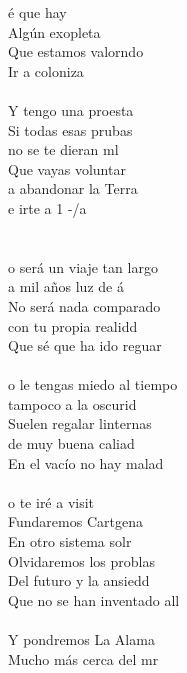 \begin{cancion}%
	é que hay\\
	Algún exopleta\\
	Que estamos valorndo\\
	Ir a coloniza\\
\jump\\
	Y tengo una proesta\\
	Si todas esas prubas \\
	no se te dieran ml\\
	Que vayas voluntar  \\
	a abandonar la Terra\\
	e irte a 1 -/a\\
\jump\\
	      \\
	o será un viaje tan largo \\
	a mil años luz de á\\
No será nada comparado \\
	con tu propia realidd\\
	Que sé que ha ido reguar\\
\jump\\
	o le tengas miedo al tiempo \\
	tampoco a la oscurid\\
Suelen regalar linternas \\
	de muy buena caliad\\
	En el vacío no hay malad\\
\jump\\
	o te iré a visit\\
	Fundaremos Cartgena\\
	En otro sistema solr\\
	Olvidaremos los problas\\
	Del futuro y la ansiedd\\
	Que no se han inventado all \\
\jump\\
	Y pondremos La Alama\\
	Mucho más cerca del mr\\

\end{cancion}
